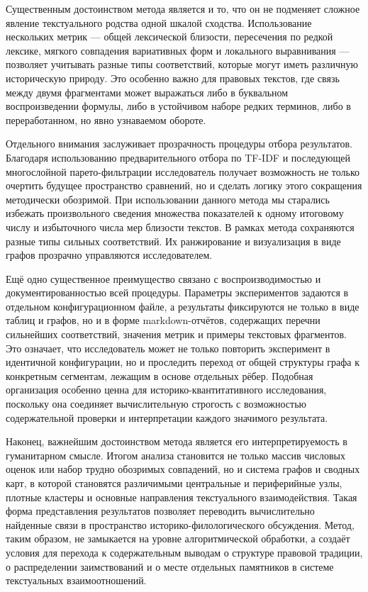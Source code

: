Существенным достоинством метода является и то, что он не подменяет сложное явление текстуального родства одной шкалой сходства. Использование нескольких метрик --- общей лексической близости, пересечения по редкой лексике, мягкого совпадения вариативных форм и локального выравнивания --- позволяет учитывать разные типы соответствий, которые могут иметь различную историческую природу. Это особенно важно для правовых текстов, где связь между двумя фрагментами может выражаться либо в буквальном воспроизведении формулы, либо в устойчивом наборе редких терминов, либо в переработанном, но явно узнаваемом обороте.

Отдельного внимания заслуживает прозрачность процедуры отбора результатов. Благодаря использованию предварительного отбора по TF-IDF и последующей многослойной парето-фильтрации исследователь получает возможность не только очертить будущее пространство сравнений, но и сделать логику этого сокращения методически обозримой. При использовании данного метода мы старались избежать произвольного сведения множества показателей к одному итоговому числу и избыточного числа мер близости текстов. В рамках метода сохраняются разные типы сильных соответствий. Их ранжирование и визуализация в виде графов прозрачно управляются исследователем.

Ещё одно существенное преимущество связано с воспроизводимостью и документированностью всей процедуры. Параметры экспериментов задаются в отдельном конфигурационном файле, а результаты фиксируются не только в виде таблиц и графов, но и в форме markdown-отчётов, содержащих перечни сильнейших соответствий, значения метрик и примеры текстовых фрагментов. Это означает, что исследователь может не только повторить эксперимент в идентичной конфигурации, но и проследить переход от общей структуры графа к конкретным сегментам, лежащим в основе отдельных рёбер. Подобная организация особенно ценна для историко-квантитативного исследования, поскольку она соединяет вычислительную строгость с возможностью содержательной проверки и интерпретации каждого значимого результата.

Наконец, важнейшим достоинством метода является его интерпретируемость в гуманитарном смысле. Итогом анализа становится не только массив числовых оценок или набор трудно обозримых совпадений, но и система графов и сводных карт, в которой становятся различимыми центральные и периферийные узлы, плотные кластеры и основные направления текстуального взаимодействия. Такая форма представления результатов позволяет переводить вычислительно найденные связи в пространство историко-филологического обсуждения. Метод, таким образом, не замыкается на уровне алгоритмической обработки, а создаёт условия для перехода к содержательным выводам о структуре правовой традиции, о распределении заимствований и о месте отдельных памятников в системе текстуальных взаимоотношений.

